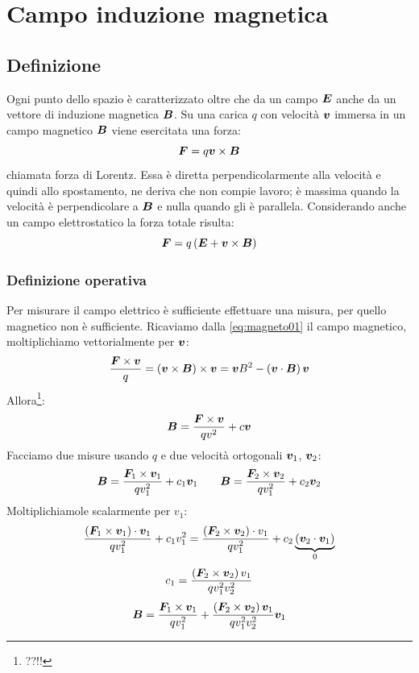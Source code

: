 \chapter{Campo induzione magnetica}
\minitoc
\section{Definizione}
Ogni punto dello spazio è caratterizzato oltre che da un campo $\boldsymbol{E}$ anche da un vettore di induzione magnetica $\boldsymbol{B}$. Su una carica $q$ con velocità $\boldsymbol{v}$ immersa in un campo magnetico $\boldsymbol{B}$ viene esercitata una forza:
\begin{equation}
  \boldsymbol{F}=q\boldsymbol{v}\times\boldsymbol{B}
  \label{eq:magneto01}
\end{equation}
chiamata forza di Lorentz. Essa è diretta perpendicolarmente alla velocità e quindi allo spostamento, ne deriva che non compie lavoro; è massima quando la velocità è perpendicolare a $\boldsymbol{B}$ e nulla quando gli è parallela. Considerando anche un campo elettrostatico la forza totale risulta:
\begin{equation}
  \boldsymbol{F}=q\left(\boldsymbol{E}+\boldsymbol{v}\times \boldsymbol{B}\right)
  \label{eq:forza_lorentz2}
\end{equation}
\subsection{Definizione operativa}
Per misurare il campo elettrico è sufficiente effettuare una misura, per quello magnetico non è sufficiente. Ricaviamo dalla \eqref{eq:magneto01} il campo magnetico, moltiplichiamo vettorialmente per $\boldsymbol{v}$:
\[\frac{\boldsymbol{F}\times\boldsymbol{v}}{q}=\left(\boldsymbol{v}\times\boldsymbol{B}\right)\times\boldsymbol{v}=\boldsymbol{v}B^2-\left(\boldsymbol{v}\cdot\boldsymbol{B}\right)\boldsymbol{v}\]
Allora\footnote{??!!}:
\[\boldsymbol{B}=\frac{\boldsymbol{F}\times\boldsymbol{v}}{qv^2}+c\boldsymbol{v}\]
Facciamo due misure usando $q$ e due velocità ortogonali $\boldsymbol{v}_1$, $\boldsymbol{v}_2$:
\[\boldsymbol{B}=\frac{\boldsymbol{F}_1\times \boldsymbol{v}_1}{qv_1^2}+c_1\boldsymbol{v}_1\qquad\boldsymbol{B}=\frac{\boldsymbol{F}_2\times\boldsymbol{v}_2}{qv_1^2}+c_2\boldsymbol{v}_2\]
Moltiplichiamole scalarmente per $v_1$:
\[\frac{\left(\boldsymbol{F}_1\times \boldsymbol{v}_1\right)\cdot\boldsymbol{v}_1}{qv_1^2}+c_1v_1^2=\frac{\left(\boldsymbol{F}_2\times\boldsymbol{v}_2\right)\cdot v_1}{qv_1^2}+c_2\underbrace{\left(\boldsymbol{v}_2\cdot \boldsymbol{v}_1\right)}_{0}\]
\[c_1=\frac{\left(\boldsymbol{F}_2\times\boldsymbol{v}_2\right)v_1}{qv_1^2v_2^2}\]
\[\boldsymbol{B}=\frac{\boldsymbol{F}_1\times\boldsymbol{v}_1}{qv_1^2}+\frac{\left(\boldsymbol{F}_2\times\boldsymbol{v}_2\right)\boldsymbol{v}_1}{qv_1^2v_2^2}\boldsymbol{v}_1\]
